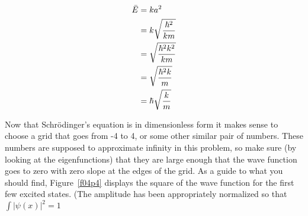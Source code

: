 \begin{enumerate}
\begin{align}
\bar{E} &= k a^2\\
&= k \sqrt{{\hbar^2\over k m}}\\
&= \sqrt{{\hbar^2 k^2\over k m}}\\
&= \sqrt{{\hbar^2 k\over m}}\\
&= \hbar\sqrt{{ k\over m}}\\
\end{align}
\fi
\end{enumerate}

Now that Schr\"{o}dinger's equation is in dimensionless form it makes
sense to choose a grid that goes from -4 to 4, or some other similar
pair of numbers. These numbers are supposed to approximate infinity
in this problem, so make sure (by looking at the eigenfunctions) that
they are large enough that the wave function goes to zero with zero
slope at the edges of the grid. As a guide to what you should find,
Figure~\ref{f04p4} displays the square of the wave function for
the first few excited states. (The amplitude has been appropriately
normalized so that $\int |\psi (x)|^2 = 1$


